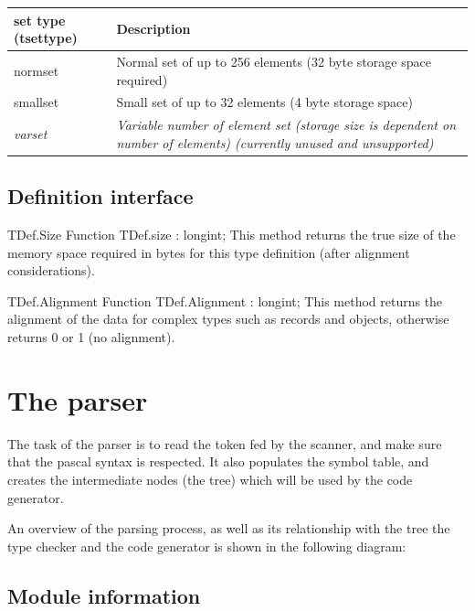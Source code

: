 \documentclass [a4paper,12pt]{article}
\begin{document}
\begin{longtable}{|l|p{10cm}|}
\hline
set type (tsettype) & Description \\
\hline
\endhead
\hline
\endfoot
\textsf{normset}&
    Normal set of up to 256 elements (32 byte storage space required) \\
\textsf{smallset}&
    Small set of up to 32 elements (4 byte storage space) \\
\textsf{\textit{varset}}&
    \textit{Variable number of element set (storage size is dependent on number
    of elements) (currently unused and unsupported)} \\
\end{longtable}

\subsection{Definition interface}
\label{subsec:definition}

\begin{function}{TDef.Size}
\Declaration
Function TDef.size : longint;
\Description
This method returns the true size of the memory space required in bytes for
this type definition (after alignment considerations).
\end{function}

\begin{function}{TDef.Alignment}
\Declaration
Function TDef.Alignment : longint;
\Description
This method returns the alignment of the data for complex types such as
records and objects, otherwise returns 0 or 1 (no alignment).
\end{function}

\section{The parser}
\label{sec:mylabel5}

The task of the parser is to read the token fed by the scanner, and make
sure that the pascal syntax is respected. It also populates the symbol
table, and creates the intermediate nodes (the tree) which will be used by
the code generator.

An overview of the parsing process, as well as its relationship with the
tree the type checker and the code generator is shown in the following
diagram:

\subsection{Module information}
\label{subsec:module}
\end{document}
